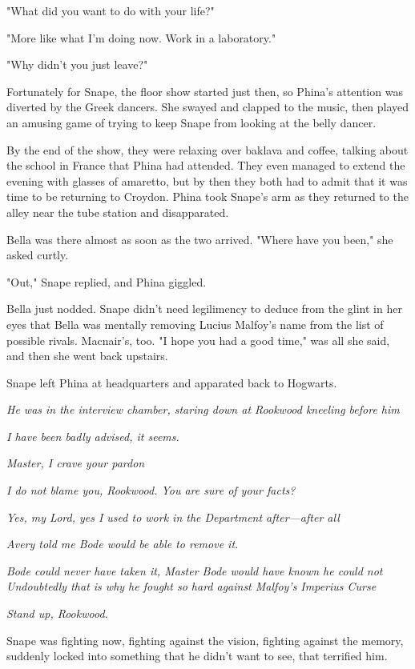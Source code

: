"What did you want to do with your life?"

"More like what I'm doing now. Work in a laboratory."

"Why didn't you just leave?"

Fortunately for Snape, the floor show started just then, so Phina's attention was diverted by the Greek dancers. She swayed and clapped to the music, then played an amusing game of trying to keep Snape from looking at the belly dancer.

By the end of the show, they were relaxing over baklava and coffee, talking about the school in France that Phina had attended. They even managed to extend the evening with glasses of amaretto, but by then they both had to admit that it was time to be returning to Croydon. Phina took Snape's arm as they returned to the alley near the tube station and disapparated.

Bella was there almost as soon as the two arrived. "Where have you been," she asked curtly.

"Out," Snape replied, and Phina giggled.

Bella just nodded. Snape didn't need legilimency to deduce from the glint in her eyes that Bella was mentally removing Lucius Malfoy's name from the list of possible rivals. Macnair's, too. "I hope you had a good time," was all she said, and then she went back upstairs.

Snape left Phina at headquarters and apparated back to Hogwarts.

\sbreak

\emph{He was in the interview chamber, staring down at Rookwood kneeling before him{\el}}

\emph{I have been badly advised, it seems.}

\emph{Master, I crave your pardon{\el}}

\emph{I do not blame you, Rookwood. You are sure of your facts?}

\emph{Yes, my Lord, yes{\el} I used to work in the Department after—after all{\el}}

\emph{Avery told me Bode would be able to remove it.}

\emph{Bode could never have taken it, Master{\el} Bode would have known he could not{\el} Undoubtedly that is why he fought so hard against Malfoy's Imperius Curse{\el}}

\emph{Stand up, Rookwood.}

Snape was fighting now, fighting against the vision, fighting against the memory, suddenly locked into something that he didn't want to see, that terrified him.

